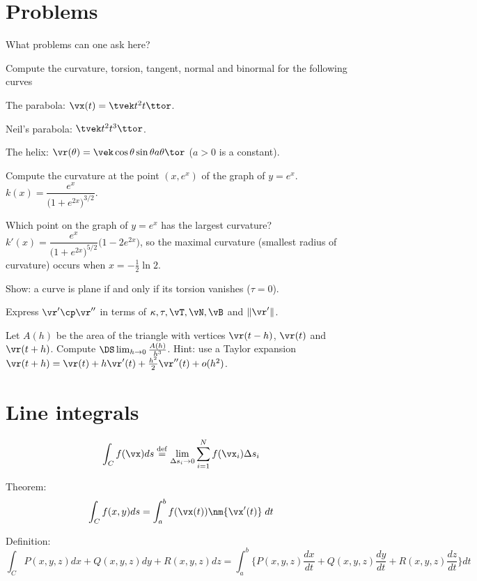 \section{Problems}
What problems can one ask here?  

\begin{multicols}{2}
\problem Compute the curvature, torsion, tangent, normal and binormal for the
following curves

\subprob The parabola: $\vx(t) = \tvek t^2 \\ t\ttor$.

\subprob Neil's parabola: $\tvek t^2\\ t^3\ttor$.

\subprob The helix: $\vr(\theta) =\vek\cos \theta \\ \sin \theta\\ a\theta\tor$
($a>0$ is a constant).

\problem 
\subprob Compute the curvature at the point $(x, e^x)$ of the graph of
$y=e^x$.
\answer
$k(x) = \dfrac{e^x} {\bigl(1+e^{2x}\bigr)^{3/2}}$.
\endanswer

\subprob Which point on the graph of $y=e^x$ has the largest curvature?
\answer $k'(x) = \dfrac{e^x} {\bigl(1+e^{2x}\bigr)^{5/2}}
\bigl(1-2e^{2x}\bigr)$, so the maximal curvature (smallest radius of
curvature) occurs when $x=-\frac{1} {2}\ln{2}$.
\endanswer

\problem Show: a curve is plane if and only if its torsion vanishes ($\tau =
0$).

\problem Express $\vr'\cp\vr''$ in terms of $\kappa, \tau, \vT, \vN, \vB$ and
$\|\vr'\|$.

\problem Let $A(h)$ be the area of the triangle with vertices $\vr(t-h)$,
$\vr(t)$ and $\vr(t+h)$.  Compute $\DS \lim_{h\to 0} \frac{A(h)}{h^3}$.
Hint: use a Taylor expansion
$\vr(t+h) = \vr(t) + h\vr'(t) + \frac{h^2}{2}\vr''(t) + o(h^2)$.
\end{multicols}


\section{Line integrals}
\begin{equation}
\int_C f(\vx) ds
\stackrel{\rm def}{=}
\lim _{\Delta s_i\to0}
\sum_{i=1}^N f(\vx_i) \Delta s_i
\end{equation}

Theorem:
\begin{equation}
\int_C f(x, y) ds = \int_a^b f(\vx(t)) \nm{\vx'(t)}\; dt
\end{equation}


Definition:
\begin{equation}
  \int_C P(x, y, z)dx + Q(x, y, z)dy + R(x, y, z)dz
  =
  \int_a^b \bigl\{P(x, y, z)\frac{dx}{dt} +
                  Q(x, y, z)\frac{dy}{dt} +
                  R(x, y, z)\frac{dz}{dt}\bigr\} dt
  \label{eq:integral-of-one-form}
\end{equation}









